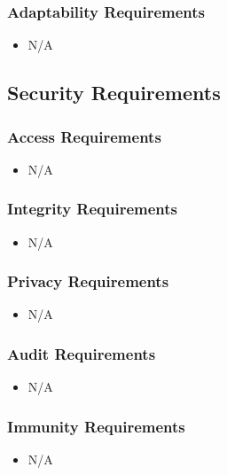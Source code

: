 \documentclass [12pt]{article}
\begin{document}
\subsubsection{Adaptability Requirements}
	\begin{itemize}
		\item N/A
	\end{itemize}

\subsection{\large Security Requirements }
\subsubsection{Access Requirements }
	\begin{itemize}
		\item N/A
	\end{itemize}

\subsubsection{Integrity Requirements }
	\begin{itemize}
		\item N/A
	\end{itemize}

\subsubsection{Privacy Requirements }
	\begin{itemize}
		\item N/A
	\end{itemize}

\subsubsection{Audit  Requirements }
	\begin{itemize}
		\item N/A
	\end{itemize} 

\subsubsection{Immunity Requirements  }
	\begin{itemize}
		\item N/A
	\end{itemize}
\end{document}
